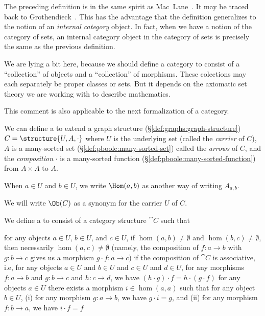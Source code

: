 \begin{remark}
The preceding definition is in the same spirit as Mac~Lane~\cite{maclane1998categories}. It may be traced back
to Grothendieck~\cite[\S4]{grothendieck1961techniques}. This has the
advantage that the definition generalizes to the notion of an
\emph{internal category} object. In fact, when we have a notion of the
category of sets, an internal category object in the category of sets
is precisely the same as the previous definition.
\end{remark}

\begin{remark}
We are lying a bit here, because we should define a category to
consist of a ``collection'' of objects and a ``collection'' of
morphisms. These colections may each separately be proper classes or sets.
But it depends on the axiomatic set theory we are working with to
describe mathematics.

This comment is also applicable to the next formalization of a category.
\end{remark}

\begin{definition}
We can define a  to extend a graph
structure (\S\ref{def:graphs:graph-structure}) $C=\structure{U,A,\cdot}$
where $U$ is the underlying set (called the \emph{carrier} of $C$),
$A$ is a many-sorted set (\S\ref{def:pboole:many-sorted-set}) called
the \emph{arrows} of $C$, and
the \emph{composition} $\cdot$ is a many-sorted function (\S\ref{def:pboole:many-sorted-function}) from
$A\times A$ to $A$.

When $a\in U$ and $b\in U$, we write $\Hom(a,b)$ as another way of
writing $A_{a,b}$.

We will write $\Ob(C)$ as a synonym for the carrier $U$ of $C$.

We define a  to consist of a category structure
$\cat{C}$ such that
\begin{itemize}
 for any objects $a\in U$, $b\in U$, and $c\in U$,
  if $\hom(a,b)\neq\emptyset$ and $\hom(b,c)\neq\emptyset$, then
  necessarily $\hom(a,c)\neq\emptyset$ (namely, the composition of
  $f\colon a\to b$ with $g\colon b\to c$ gives us a morphism
  $g\cdot f\colon a\to c$)
 if the composition of $\cat{C}$ is associative,
i.e, for any objects $a\in U$ and $b\in U$ and $c\in U$ and $d\in U$, for any
morphisms $f\colon a\to b$ and $g\colon b\to c$ and $h\colon c\to d$,
we have $(h\cdot g)\cdot f=h\cdot(g\cdot f)$
 for any objects $a\in U$ there exists a morphism
$i\in\hom(a,a)$ such that for any object $b\in U$,
 (i) for any morphism $g\colon a\to b$, we have $g\cdot i=g$, and\hfill\break
 (ii) for any morphism $f\colon b\to a$, we have $i\cdot f=f$
\end{itemize}
\end{definition}

